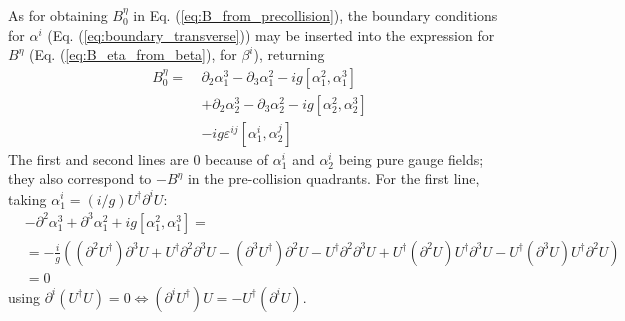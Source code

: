 As for obtaining $B^\eta_0$ in Eq. (\ref{eq:B_from_precollision}), the boundary conditions for $\alpha^i$ (Eq. (\ref{eq:boundary_transverse})) may be inserted into the expression for $B^\eta$ (Eq. (\ref{eq:B_eta_from_beta}), for $\beta^i$), returning
\begin{equation}
\begin{split}
	B^\eta_0 = ~ & \partial_2 \alpha^3_1 - \partial_3 \alpha^2_1 - ig [\alpha^2_1, \alpha^3_1] \\
	& + \partial_2 \alpha^3_2 - \partial_3 \alpha^2_2 - ig [\alpha^2_2, \alpha^3_2] \\
	& - ig \varepsilon^{ij} [\alpha^i_1, \alpha^j_2]
\end{split}
\end{equation}
The first and second lines are $0$ because of $\alpha^i_1$ and $\alpha^i_2$ being pure gauge fields; they also correspond to $-B^\eta$ in the pre-collision quadrants. For the first line, taking $\alpha_1^i = (i/g) U^\dagger \partial^i U$:
\begin{equation}
\begin{split}
	 & -  \partial^2 \alpha^3_1 + \partial^3 \alpha^2_1 + ig [\alpha^2_1, \alpha^3_1] = \\
	& = -\frac{i}{g} \left( (\partial^2 U^\dagger) \partial^3 U + U^\dagger \partial^2 \partial^3 U - (\partial^3 U^\dagger)\partial^2 U - U^\dagger \partial^2 \partial^3 U + U^\dagger (\partial^2 U) U^\dagger \partial^3 U - U^\dagger (\partial^3 U) U^\dagger \partial^2 U \right) \\
	& = 0
	\end{split}
\end{equation}
using $\partial^i (U^\dagger U) = 0 \Leftrightarrow (\partial^i U^\dagger) U = - U^\dagger (\partial^i U)$.